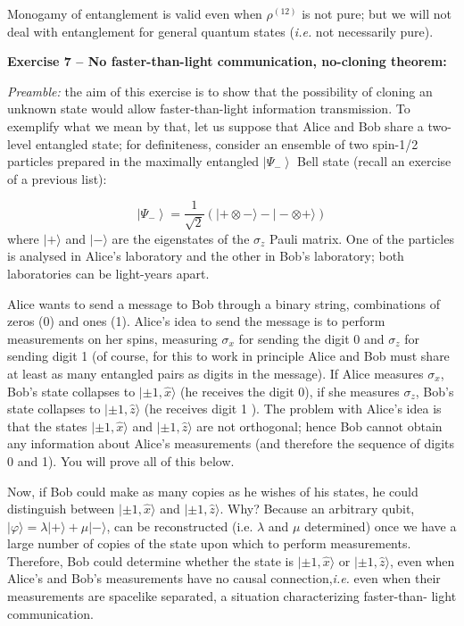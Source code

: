 \documentclass[12pt]{article}
\newcommand{\be}{\begin{equation}}
\newcommand{\ee}{\end{equation}}
\begin{document}
Monogamy of entanglement is valid even when \(\rho^{(12)}\) is not pure; but we will not deal with
entanglement for general quantum states (\textit{i.e.} not necessarily pure).

\textbf{Exercise 7 -- No faster-than-light communication, no-cloning theorem:}

\emph{Preamble:} the aim of this exercise is to show that the possibility of cloning an unknown state would
allow faster-than-light information transmission. To exemplify what we mean by that, let us
suppose that Alice and Bob share a two-level entangled state; for definiteness, consider an
ensemble of two spin-1/2 particles prepared in the maximally entangled \(\left|\Psi_{-}\right\rangle\) Bell state (recall
an exercise of a previous list):

\be
\left|\Psi_{-}\right\rangle=\frac{1}{\sqrt{2}}(|+\otimes-\rangle-|-\otimes+\rangle)
\ee
where \(|+\rangle\) and \(|-\rangle\) are the eigenstates of the \(\sigma_{z}\) Pauli matrix. One of the particles is analysed
in Alice's laboratory and the other in Bob's laboratory; both laboratories can be light-years
apart.

Alice wants to send a message to Bob through a binary string, combinations of zeros (0)
and ones (1). Alice's idea to send the message is to perform measurements on her spins,
measuring \(\sigma_{x}\) for sending the digit 0 and \(\sigma_{z}\) for sending digit 1 (of course, for this to work in
principle Alice and Bob must share at least as many entangled pairs as digits in the message).
If Alice measures \(\sigma_{x}\), Bob's state collapses to \(|\pm 1, \hat{x}\rangle\) (he receives the digit 0), if she measures \(\sigma_{z}\),
Bob's state collapses to \(|\pm 1, \hat{z}\rangle\) (he receives digit 1 ). The problem with Alice's idea is that the
states \(|\pm 1, \hat{x}\rangle\) and \(|\pm 1, \hat{z}\rangle\) are not orthogonal; hence Bob cannot obtain any information about
Alice's measurements (and therefore the sequence of digits 0 and 1). You will prove all of this
below.

Now, if Bob could make as many copies as he wishes of his states, he could distinguish
between \(|\pm 1, \hat{x}\rangle\) and \(|\pm 1, \hat{z}\rangle\). Why? Because an arbitrary qubit, \(|\varphi\rangle=\lambda|+\rangle+\mu|-\rangle\), can be
reconstructed (i.e. \(\lambda\) and \(\mu\) determined) once we have a large number of copies of the state
upon which to perform measurements. Therefore, Bob could determine whether the state is
\(|\pm 1, \hat{x}\rangle\) or \(|\pm 1, \hat{z}\rangle\), even when Alice's and Bob's measurements have no causal connection,\textit{i.e.}
even when their measurements are spacelike separated, a situation characterizing faster-than-
light communication.
\end{document}
